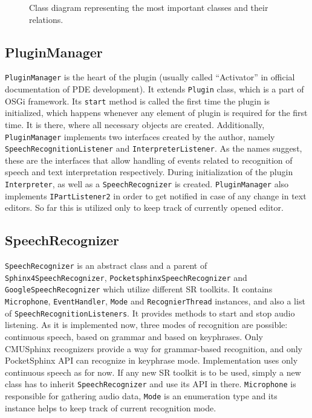 \begin{figure}
    \centering
     \caption{Class diagram representing the most important classes and their relations.}
    \label{fig:classDiagram}
 \end{figure}


\subsection{PluginManager}

\texttt{PluginManager} is the heart of the plugin (usually called ``Activator'' in official documentation of PDE development). It extends \texttt{Plugin} class, which is a part of OSGi framework. Its \texttt{start} method is called the first time the plugin is initialized, which happens whenever any element of plugin is required for the first time. It is there, where all necessary objects are created. Additionally, \texttt{PluginManager} implements two interfaces created by the author, namely \texttt{SpeechRecognitionListener} and \texttt{InterpreterListener}. As the names suggest, these are the interfaces that allow handling of events related to recognition of speech and text interpretation respectively. During initialization of the plugin \texttt{Interpreter}, as well as a \texttt{SpeechRecognizer} is created. \texttt{PluginManager} also implements \texttt{IPartListener2} in order to get notified in case of any change in text editors. So far this is utilized only to keep track of currently opened editor.

\subsection{SpeechRecognizer}
\texttt{SpeechRecognizer} is an abstract class and a parent of \texttt{Sphinx4SpeechRecognizer}, \texttt{PocketsphinxSpeechRecognizer} and \texttt{GoogleSpeechRecognizer} which utilize different SR toolkits. It contains \texttt{Microphone}, \texttt{EventHandler}, \texttt{Mode} and \texttt{RecognierThread} instances, and also a list of \texttt{SpeechRecognitionListeners}. It provides methods to start and stop audio listening. As it is implemented now, three modes of recognition are possible: continuous speech, based on grammar and based on keyphrases. Only CMUSphinx recognizers provide a way for grammar-based recognition, and only PocketSphinx API can recognize in keyphrase mode. Implementation uses only continuous speech as for now. If any new SR toolkit is to be used, simply a new class has to inherit \texttt{SpeechRecognizer} and use its API in there. 
\texttt{Microphone} is responsible for gathering audio data, \texttt{Mode} is an enumeration type and its instance helps to keep track of current recognition mode.

